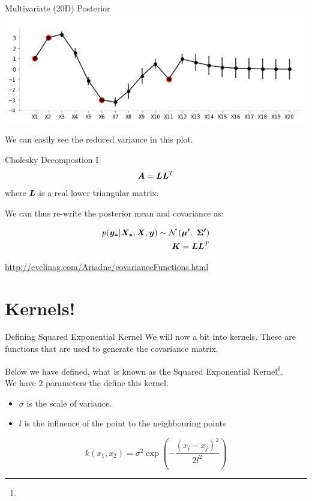 \documentclass{beamer}
\begin{document}
\begin{frame}{Multivariate (20D) Posterior}
	\begin{center}
		\includegraphics[width=\linewidth, height=\textheight -120pt ,keepaspectratio]{gp/20dcov} \\
	\end{center}
	We can easily see the reduced variance in this plot.
\end{frame}

\begin{frame}{Cholesky Decompostion I}
\begin{align*}
\bm{A} = \bm{L}\bm{L}^T
\end{align*}
where $\bm{L}$ is a real lower triangular matrix.

We can thus re-write the posterior mean and covariance as:

\begin{align*}
p(\bm{y_*}|\bm{X_*}, \bm{X}, \bm{y}) \sim \mathcal{N}\left(\bm{\mu'}, \ \bm{\Sigma'}\right) \\
\bm{K} = \bm{LL}^T \\
\end{align*}
\end{frame}

\urldef\urlsek\url{http://evelinag.com/Ariadne/covarianceFunctions.html}
\section{Kernels!}
\begin{frame}{Defining Squared Exponential Kernel}
	We will now a bit into kernels. These are functions that are used to generate the covariance matrix.
	
	Below we have defined, what is known as the Squared Exponential Kernel\footnote{\urlsek}. \\
	
	We have 2 parameters the define this kernel.
	\begin{itemize}
		\item $\sigma$ is the scale of variance.
		\item $l$ is the influence of the point to the neighbouring points
	\end{itemize}

	$$
	k(x_1, x_2) = \sigma^2 \exp\left(-\frac{(x_i - x_j)^2}{2l^2}\right)
	$$
\end{frame}
\end{document}
